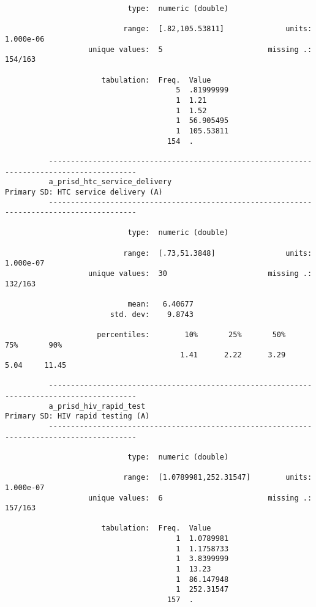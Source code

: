 \documentclass{article}
\begin{document}
\begin{verbatim}
                            type:  numeric (double)
          
                           range:  [.82,105.53811]              units:  1.000e-06
                   unique values:  5                        missing .:  154/163
          
                      tabulation:  Freq.  Value
                                       5  .81999999
                                       1  1.21
                                       1  1.52
                                       1  56.905495
                                       1  105.53811
                                     154  .
          
          ------------------------------------------------------------------------------------------
          a_prisd_htc_service_delivery                          Primary SD: HTC service delivery (A)
          ------------------------------------------------------------------------------------------
          
                            type:  numeric (double)
          
                           range:  [.73,51.3848]                units:  1.000e-07
                   unique values:  30                       missing .:  132/163
          
                            mean:   6.40677
                        std. dev:    9.8743
          
                     percentiles:        10%       25%       50%       75%       90%
                                        1.41      2.22      3.29      5.04     11.45
          
          ------------------------------------------------------------------------------------------
          a_prisd_hiv_rapid_test                                   Primary SD: HIV rapid testing (A)
          ------------------------------------------------------------------------------------------
          
                            type:  numeric (double)
          
                           range:  [1.0789981,252.31547]        units:  1.000e-07
                   unique values:  6                        missing .:  157/163
          
                      tabulation:  Freq.  Value
                                       1  1.0789981
                                       1  1.1758733
                                       1  3.8399999
                                       1  13.23
                                       1  86.147948
                                       1  252.31547
                                     157  .
          

\end{verbatim}
\end{document}
